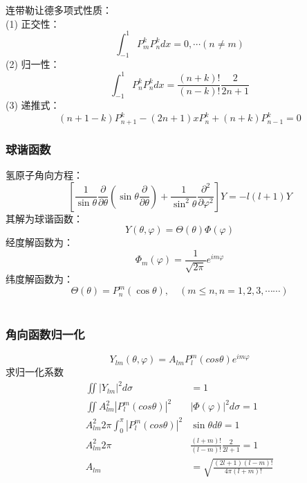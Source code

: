 \begin{frame}
	连带勒让德多项式性质：\\
	(1) 正交性： 
	\begin{equation*}
		\int_{-1}^{1} P^k _mP^k _n dx =0 ,\cdots (n\ne m)
	\end{equation*}	
	(2) 归一性：
	\begin{equation*}
		\int_{-1}^{1} P^k _nP^k _n dx =  \frac{(n+k)!}{(n-k)!}\frac{2}{2n+1}
	\end{equation*}	
	(3) 递推式： 
	\begin{equation*}
		(n+1-k)P^k _{n+1} -(2n+1)x P^k _n + (n+k) P^k _{n-1} =0 
	\end{equation*}		
\end{frame}	

\begin{frame}
	\frametitle{球谐函数}
	氢原子角向方程：
	\begin{equation*}
		\left[ \frac{1}{ \sin \theta  } \frac{\partial }{\partial \theta } (\sin \theta \frac{\partial }{\partial \theta } )
		+\frac{1}{ \sin^2 \theta  } \frac{\partial^2}{\partial\varphi ^2} \right] Y=-l(l+1) Y 
	\end{equation*}	
	其解为球谐函数：
	\begin{equation*}
		Y(\theta,\varphi)= \Theta(\theta) \Phi(\varphi)
	\end{equation*}	
	经度解函数为：
	\begin{equation*}
		\Phi_m (\varphi)=\frac{1}{\sqrt{2\pi}} e^{im\varphi} 
	\end{equation*}
	纬度解函数为：
	\begin{equation*}
		\Theta(\theta)= P^m  _{n}(\cos \theta) ,  \quad(m \le n, n=1,2,3, \cdots \cdots)
	\end{equation*}	 
\end{frame}	

\begin{frame}
	\frametitle{角向函数归一化}
	\begin{equation*}
		Y_{lm} (\theta,\varphi)= A_{lm}  P_l ^m (cos \theta)  e^{im\varphi} 
	\end{equation*}	
	求归一化系数
	\begin{equation*}
	\begin{split}
	 	\iint  |Y_{lm}| ^2  d \sigma & =1  \\
	 	\iint  A^2_{lm}  |P_l ^m (cos \theta)|^2 & |\Phi (\varphi)|^2 d \sigma   =1  \\
        A^2_{lm} 2\pi  \int_{0}^{\pi}    |P_l ^m (cos \theta)|^2&  \sin \theta d\theta =1 \\
        A^2_{lm}  2\pi & \frac{(l+m)!}{(l-m)!}  \frac{2}{2l+1}  =1 \\
        A_{lm} &= \sqrt{\frac{(2l+1)(l-m)!}{4\pi (l+m)!}}
	\end{split}		
	\end{equation*}	 
\end{frame}	

